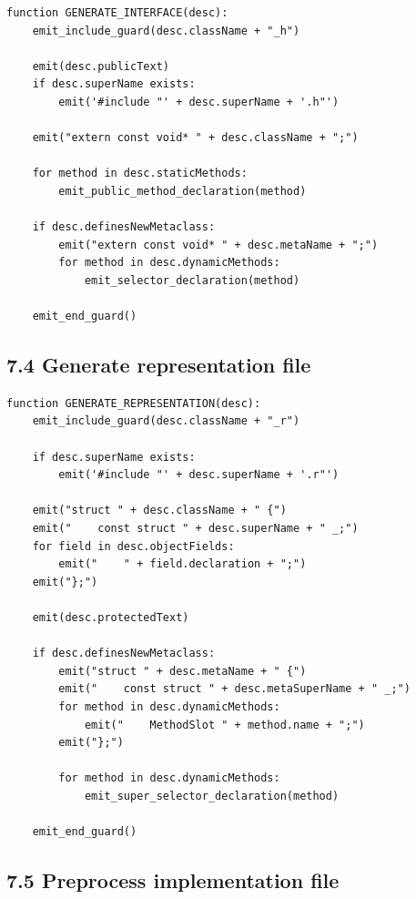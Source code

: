 \documentclass[11pt]{article}
\begin{document}
\begin{verbatim}
function GENERATE_INTERFACE(desc):
    emit_include_guard(desc.className + "_h")

    emit(desc.publicText)
    if desc.superName exists:
        emit('#include "' + desc.superName + '.h"')

    emit("extern const void* " + desc.className + ";")

    for method in desc.staticMethods:
        emit_public_method_declaration(method)

    if desc.definesNewMetaclass:
        emit("extern const void* " + desc.metaName + ";")
        for method in desc.dynamicMethods:
            emit_selector_declaration(method)

    emit_end_guard()
\end{verbatim}

\subsection{7.4 Generate representation
file}\label{generate-representation-file}

\begin{verbatim}
function GENERATE_REPRESENTATION(desc):
    emit_include_guard(desc.className + "_r")

    if desc.superName exists:
        emit('#include "' + desc.superName + '.r"')

    emit("struct " + desc.className + " {")
    emit("    const struct " + desc.superName + " _;")
    for field in desc.objectFields:
        emit("    " + field.declaration + ";")
    emit("};")

    emit(desc.protectedText)

    if desc.definesNewMetaclass:
        emit("struct " + desc.metaName + " {")
        emit("    const struct " + desc.metaSuperName + " _;")
        for method in desc.dynamicMethods:
            emit("    MethodSlot " + method.name + ";")
        emit("};")

        for method in desc.dynamicMethods:
            emit_super_selector_declaration(method)

    emit_end_guard()
\end{verbatim}

\subsection{7.5 Preprocess implementation
file}\label{preprocess-implementation-file}
\end{document}
